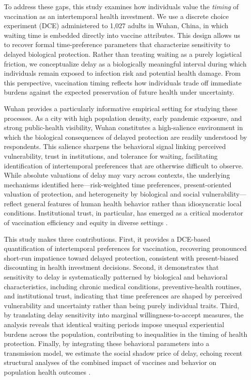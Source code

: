 \documentclass[preprint,12pt]{elsarticle}
\begin{document}
To address these gaps, this study examines how individuals value the \emph{timing} of vaccination as an intertemporal health investment. We use a discrete choice experiment (DCE) administered to 1{,}027 adults in Wuhan, China, in which waiting time is embedded directly into vaccine attributes. This design allows us to recover formal time-preference parameters that characterize sensitivity to delayed biological protection. Rather than treating waiting as a purely logistical friction, we conceptualize delay as a biologically meaningful interval during which individuals remain exposed to infection risk and potential health damage. From this perspective, vaccination timing reflects how individuals trade off immediate burdens against the expected preservation of future health under uncertainty.

Wuhan provides a particularly informative empirical setting for studying these processes. As a city with high population density, early pandemic exposure, and strong public-health visibility, Wuhan constitutes a high-salience environment in which the biological consequences of delayed protection are readily understood by respondents. This salience sharpens the behavioral signal linking perceived vulnerability, trust in institutions, and tolerance for waiting, facilitating identification of intertemporal preferences that are otherwise difficult to observe. While absolute valuations of delay may vary across contexts, the underlying mechanisms identified here—risk-weighted time preferences, present-oriented valuation of protection, and heterogeneity by biological and social vulnerability—reflect general features of human health behavior rather than idiosyncratic local conditions. Institutional trust, in particular, has emerged as a critical moderator of vaccination efficiency and equity in diverse settings \cite{Sohns2024, MacDonald2025}. 

This study makes three contributions. First, it provides a DCE-based quantification of intertemporal preferences for vaccination, recovering pronounced short-run impatience toward delayed protection, consistent with present-biased discounting in health investment decisions. Second, it demonstrates that sensitivity to delay is systematically patterned by biological and behavioral characteristics, including chronic medical conditions, preventive-health routines, and institutional trust, indicating that time preferences are shaped by perceived vulnerability and uncertainty rather than being purely individual traits. Third, by translating delay sensitivity into marginal willingness-to-accept measures, the analysis reveals that identical waiting periods impose unequal experiential burdens across the population, contributing to inequalities in the timing of health protection. Finally, by integrating these behavioral parameters into a transmission model, we estimate the social shadow price of delay, echoing recent structural analyses of the combined impact of vaccines and behavior on population health outcomes \cite{Atkeson2024}. 
\end{document}
